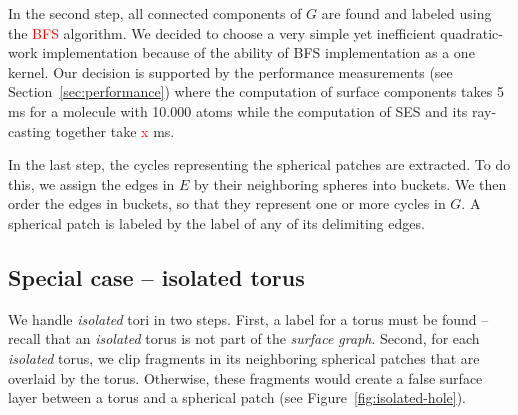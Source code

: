 In the second step, all connected components of $G$ are found and labeled using the \textcolor{red}{BFS} algorithm.
We decided to choose a very simple yet inefficient \cite{merrill2012scalable} quadratic-work implementation because of the ability of BFS implementation as a one kernel.
Our decision is supported by the performance measurements (see Section~\ref{sec:performance}) where the computation of surface components takes {\tweakedsim}5 ms for a molecule with {\tweakedsim}10.000 atoms while the computation of SES and its ray-casting together take {\tweakedsim}\textcolor{red}{x} ms.

In the last step, the cycles representing the spherical patches are extracted.
To do this, we assign the edges in $E$ by their neighboring spheres into buckets.
We then order the edges in buckets, so that they represent one or more cycles in $G$.
A spherical patch is labeled by the label of any of its delimiting edges.

\subsection{Special case -- isolated torus}
\label{sec:isolated}

We handle \textit{isolated} tori in two steps.
First, a label for a torus must be found -- recall that an \textit{isolated} torus is not part of the \textit{surface graph}.
Second, for each \textit{isolated} torus, we clip fragments in its neighboring spherical patches that are overlaid by the torus. Otherwise, these fragments would create a false surface layer between a torus and a spherical patch (see Figure~\ref{fig:isolated-hole}).

